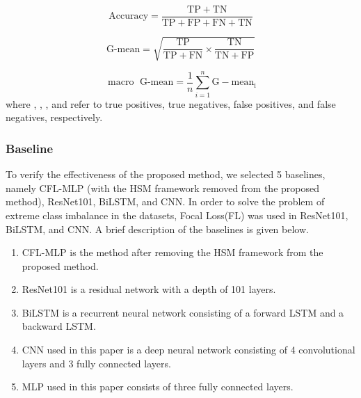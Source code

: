 \documentclass[lettersize,journal]{IEEEtran}
\begin{document}
\begin{equation}
\text{Accuracy} = \frac{\mathrm{TP}+\mathrm{TN}}{\mathrm{TP+FP+FN+TN}}
\label{acc}
\end{equation}

\begin{equation}
\text{G-mean} = \sqrt{ \frac{\mathrm{TP}}{\mathrm{TP+FN}} \times \frac{\mathrm{TN}}{\mathrm{TN+FP}}}
\label{gmean}
\end{equation}

\begin{equation}
\operatorname{macro} \text{ G-mean}=\frac{1}{n} \sum_{i=1}^n \mathrm{G-mean_i}
\label{macrogmean}
\end{equation}
where , , , and  refer to true positives, true negatives, false positives, and false negatives, respectively.

\subsubsection{Baseline}%

To verify the effectiveness of the proposed method, we selected 5 baselines, namely CFL-MLP (with the HSM framework removed from the proposed method), ResNet101, BiLSTM, and CNN. In order to solve the problem of extreme class imbalance in the datasets, Focal Loss(FL)\cite{lin2017focal} was used in ResNet101, BiLSTM, and CNN. A brief description of the baselines is given below.

\begin{enumerate}%
\item CFL-MLP is the method after removing the HSM framework from the proposed method.
\item ResNet101 is a residual network with a depth of 101 layers.
\item BiLSTM is a recurrent neural network consisting of a forward LSTM and a backward LSTM.
\item CNN used in this paper is a deep neural network consisting of 4 convolutional layers and 3 fully connected layers.
\item MLP used in this paper consists of three fully connected layers.
\end{enumerate}
\end{document}
